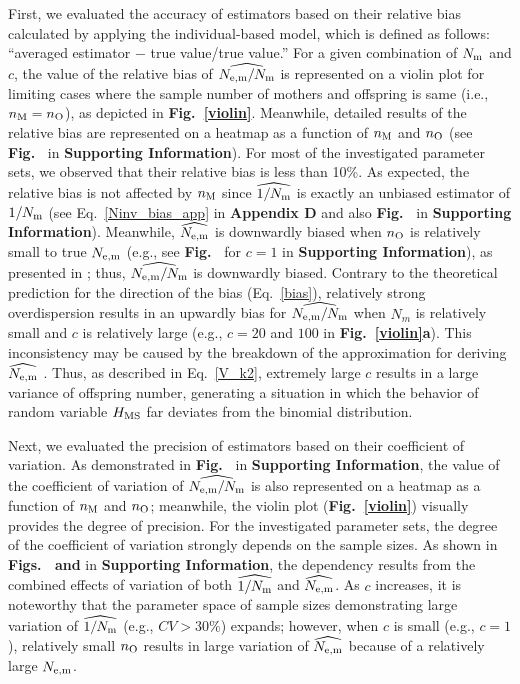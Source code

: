 \documentclass[12pt, English]{article}
\begin{document}
\begin{spacing}{1.9}
First, we evaluated the accuracy of estimators based on their relative bias calculated by applying the individual-based model, which is defined as follows: ``averaged estimator $-$ true value/true value.'' For a given combination of $N_{\rm m}$ and $c$, the value of the relative bias of $\widehat{N_{\rm e,m}/N_{\rm m}}$ is represented on a violin plot for limiting cases where the sample number of mothers and offspring is same (i.e., $n_{\rm M} = n_{\rm O}$), as depicted in {\bf Fig.~\ref{violin}}. Meanwhile, detailed results of the relative bias are represented on a heatmap as a function of $n_{\rm M}$ and $n_{\rm O}$ (see {\bf Fig.~\NeNbias{}} in {\bf Supporting Information}). For most of the investigated parameter sets, we observed that their relative bias is less than 10\%. As expected, the relative bias is not affected by $n_{\rm M}$ since $\widehat{1/N_{\rm m}}$ is exactly an unbiased estimator of $1/N_{\rm m}$ (see Eq.~\ref{Ninv_bias_app} in {\bf Appendix D} and also {\bf Fig.~\Ninvbias{}} in {\bf Supporting Information}). Meanwhile, $\widehat{N_{\rm e,m}}$ is downwardly biased when $n_{\rm O}$ is relatively small to true $N_{\rm e,m}$ (e.g., see {\bf Fig.~\Nebias{}} for $c=1$ in {\bf Supporting Information}), as presented in \cite{Akita_2019}; thus, $\widehat{N_{\rm e,m}/N_{\rm m}}$ is downwardly biased. Contrary to the theoretical prediction for the direction of the bias (Eq.~\ref{bias}), relatively strong overdispersion results in an upwardly bias for $\widehat{N_{\rm e,m}/N_{\rm m}}$ when $N_m$ is relatively small and $c$ is relatively large (e.g., $c=20$ and $100$ in {\bf Fig.~\ref{violin}a}). This inconsistency may be caused by the breakdown of the approximation for deriving $\widehat{N_{\rm e,m}}$ \cite[Eq.~S14 in][]{Akita_2019}. Thus, as described in Eq.~\ref{V_k2}, extremely large $c$ results in a large variance of offspring number, generating a situation in which the behavior of random variable $H_{\rm MS}$ far deviates from the binomial distribution. 

Next, we evaluated the precision of estimators based on their coefficient of variation. As demonstrated in {\bf Fig.~\NeNcv{}} in {\bf Supporting Information}, the value of the coefficient of variation of $\widehat{N_{\rm e,m}/N_{\rm m}}$ is also represented on a heatmap as a function of $n_{\rm M}$ and $n_{\rm O}$; meanwhile, the violin plot ({\bf Fig.~\ref{violin}}) visually provides the degree of precision. For the investigated parameter sets, the degree of the coefficient of variation strongly depends on the sample sizes. As shown in {\bf Figs.~\Necv{} and \Ninvcv{}} in {\bf Supporting Information}, the dependency results from the combined effects of variation of both $\widehat{1/N_{\rm m}}$ and $\widehat{N_{\rm e,m}}$. As $c$ increases, it is noteworthy that the parameter space of sample sizes demonstrating large variation of $\widehat{1/N_{\rm m}}$ (e.g., $CV>30\%$) expands; however, when $c$ is small (e.g., $c=1$), relatively small $n_{\rm O}$ results in large variation of $\widehat{N_{\rm e,m}}$ because of a relatively large $N_{\rm e,m}$. 
 

\end{spacing}
\end{document}
